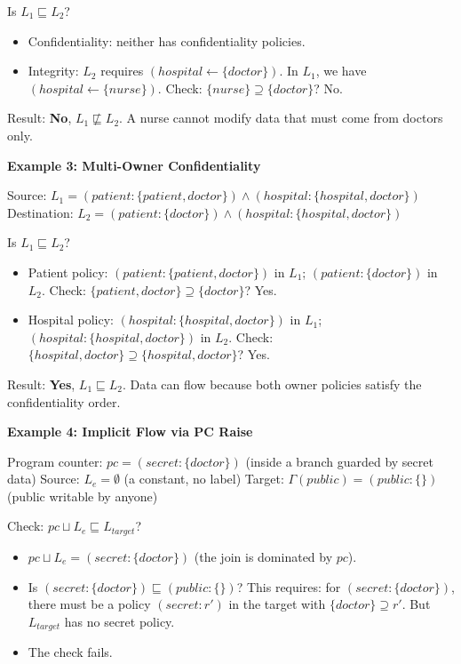 Is $L_1 \sqsubseteq L_2$?

\begin{itemize}
    \item Confidentiality: neither has confidentiality policies.
    \item Integrity: $L_2$ requires $(hospital \leftarrow \{doctor\})$. In $L_1$, we have $(hospital \leftarrow \{nurse\})$. Check: $\{nurse\} \supseteq \{doctor\}$? No.
\end{itemize}

Result: \textbf{No}, $L_1 \not\sqsubseteq L_2$. A nurse cannot modify data that must come from doctors only.

\textbf{Example 3: Multi-Owner Confidentiality}

Source: $L_1 = (patient:\{patient,doctor\}) \wedge (hospital:\{hospital,doctor\})$
Destination: $L_2 = (patient:\{doctor\}) \wedge (hospital:\{hospital,doctor\})$

Is $L_1 \sqsubseteq L_2$?

\begin{itemize}
    \item Patient policy: $(patient:\{patient,doctor\})$ in $L_1$; $(patient:\{doctor\})$ in $L_2$. Check: $\{patient,doctor\} \supseteq \{doctor\}$? Yes.
    \item Hospital policy: $(hospital:\{hospital,doctor\})$ in $L_1$; $(hospital:\{hospital,doctor\})$ in $L_2$. Check: $\{hospital,doctor\} \supseteq \{hospital,doctor\}$? Yes.
\end{itemize}

Result: \textbf{Yes}, $L_1 \sqsubseteq L_2$. Data can flow because both owner policies satisfy the confidentiality order.

\textbf{Example 4: Implicit Flow via PC Raise}

Program counter: $pc = (secret:\{doctor\})$ (inside a branch guarded by secret data)
Source: $L_e = \emptyset$ (a constant, no label)
Target: $\Gamma(public) = (public:\{\})$ (public writable by anyone)

Check: $pc \sqcup L_e \sqsubseteq L_{target}$?

\begin{itemize}
    \item $pc \sqcup L_e = (secret:\{doctor\})$ (the join is dominated by $pc$).
    \item Is $(secret:\{doctor\}) \sqsubseteq (public:\{\})$? This requires: for $(secret:\{doctor\})$, there must be a policy $(secret:r')$ in the target with $\{doctor\} \supseteq r'$. But $L_{target}$ has no secret policy. 
    \item The check fails.
\end{itemize}

